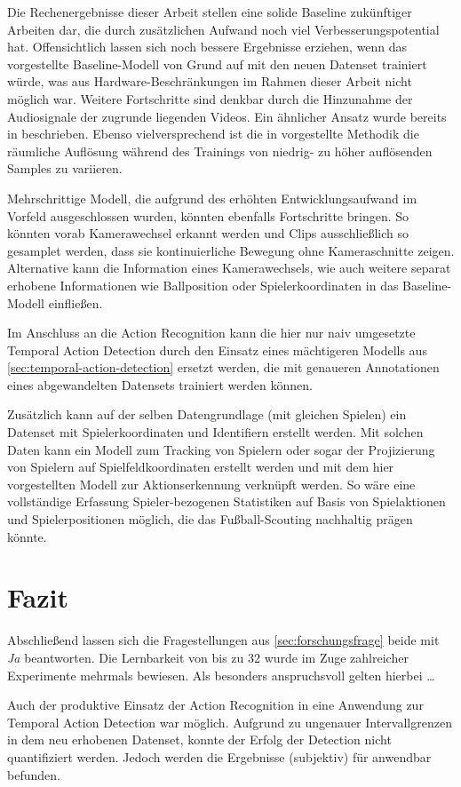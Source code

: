 Die Rechenergebnisse dieser Arbeit stellen eine solide Baseline zukünftiger Arbeiten dar, die durch zusätzlichen Aufwand noch viel Verbesserungspotential hat.
Offensichtlich lassen sich noch bessere Ergebnisse erziehen, wenn das vorgestellte Baseline-Modell von Grund auf mit den neuen Datenset trainiert würde, was aus Hardware-Beschränkungen im Rahmen dieser Arbeit nicht möglich war.
Weitere Fortschritte sind denkbar durch die Hinzunahme der Audiosignale der zugrunde liegenden Videos.
Ein ähnlicher Ansatz wurde bereits in \cite{Wang19} beschrieben.
Ebenso vielversprechend ist die in \cite{Wu20} vorgestellte Methodik die räumliche Auflösung während des Trainings von niedrig- zu höher auflösenden Samples zu variieren.

Mehrschrittige Modell, die aufgrund des erhöhten Entwicklungsaufwand im Vorfeld ausgeschlossen wurden, könnten ebenfalls Fortschritte bringen.
So könnten \zB vorab Kamerawechsel erkannt werden und Clips ausschließlich so gesamplet werden, dass sie kontinuierliche Bewegung ohne Kameraschnitte zeigen.
Alternative kann die Information eines Kamerawechsels, wie auch weitere separat erhobene Informationen wie Ballposition oder Spielerkoordinaten in das Baseline-Modell einfließen.

Im Anschluss an die Action Recognition kann die hier nur naiv umgesetzte Temporal Action Detection durch den Einsatz eines mächtigeren Modells aus \autoref{sec:temporal-action-detection} ersetzt werden, die mit genaueren Annotationen eines abgewandelten Datensets trainiert werden können.

Zusätzlich kann auf der selben Datengrundlage (mit gleichen Spielen) ein Datenset mit Spielerkoordinaten und Identifiern erstellt werden.
Mit solchen Daten kann \ggf ein Modell zum Tracking von Spielern oder sogar der Projizierung von Spielern auf Spielfeldkoordinaten erstellt werden und mit dem hier vorgestellten Modell zur Aktionserkennung verknüpft werden.
So wäre eine vollständige Erfassung Spieler-bezogenen Statistiken auf Basis von Spielaktionen und Spielerpositionen möglich, die das Fußball-Scouting nachhaltig prägen könnte.

\section{Fazit}
\label{sec:fazit}

Abschließend lassen sich die Fragestellungen aus \autoref{sec:forschungsfrage} beide mit \emph{Ja} beantworten.
Die Lernbarkeit von bis zu 32 wurde im Zuge zahlreicher Experimente mehrmals bewiesen.
Als besonders anspruchsvoll gelten hierbei \dots


Auch der produktive Einsatz der Action Recognition in eine Anwendung zur Temporal Action Detection war möglich.
Aufgrund zu ungenauer Intervallgrenzen in dem neu erhobenen Datenset, konnte der Erfolg der Detection nicht quantifiziert werden.
Jedoch werden die Ergebnisse (subjektiv) für anwendbar befunden.
